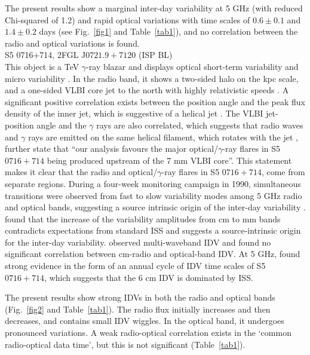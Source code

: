 \documentclass[a4paper,fleqn,usenatbib]{mnras}
\begin{document}
The present results show a marginal inter-day variability at 5 GHz (with reduced Chi-squared of 1.2) and rapid optical variations with time scales of \(0.6\pm0.1\) and \(1.4\pm0.2\) days (see Fig.~\ref{fig1} and Table~\ref{tab1}), and no correlation between the radio and optical variations is found.\\

S5 0716+714, 2FGL J\(0721.9+7120\) (ISP BL)\\

This object is a TeV \(\gamma\)-ray blazar and displays optical short-term variability and micro variability \citep{hu14,man16}. In the radio band, it shows a two-sided halo on the kpc scale, and a one-sided VLBI core jet to the north with highly relativistic speeds \citep{rani15,lis16}. A significant positive correlation exists between the position angle and the peak flux density of the inner jet, which is suggestive of a helical jet \citep{liu12c}. The VLBI jet-position angle and the \(\gamma\) rays are also correlated, which suggests that  radio waves and \(\gamma\) rays are emitted on the same helical filament, which rotates with the jet \citep{rani14}, \cite{rani15} further state that ``our analysis favours the major optical/\(\gamma\)-ray flares in S5 \(0716+714\) being produced upstream of the 7 mm VLBI core''. This statement makes it clear that the radio and optical/\(\gamma\)-ray flares in S5 \(0716+714\), come from separate regions. During a four-week monitoring campaign in 1990, simultaneous transitions were observed from fast to slow variability modes among 5 GHz radio and optical bands, suggesting a source intrinsic origin of the inter-day variability \citep{quir91}. \cite{fuhr08} found that the increase of the variability amplitudes from cm to mm bands contradicts expectations from standard ISS and suggests a source-intrinsic origin for the inter-day variability. \cite{gupta12} observed multi-waveband IDV and found no significant correlation between cm-radio and optical-band IDV. At 5 GHz, \cite{liu12b} found strong evidence in the form of an annual cycle of IDV time scales of S5 \(0716+714\), which suggests that the 6 cm IDV is dominated by ISS.

The present results show strong IDVs in both the radio and optical bands (Fig.~\ref{fig2} and Table~\ref{tab1}). The radio flux initially increases and then decreases, and contains small IDV wiggles. In the optical band, it undergoes pronounced variations. A weak radio-optical correlation exists in the `common radio-optical data time', but this is not significant (Table~\ref{tab1}).\\
\end{document}
